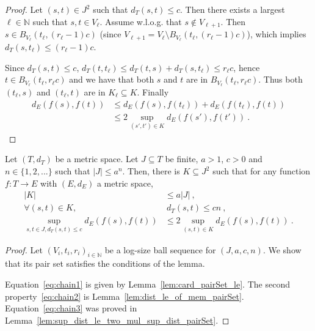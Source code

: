 \begin{proof}
\leanok
Let $(s, t) \in J^2$ such that $d_T(s, t) \le c$.
Then there exists a largest $\ell \in \mathbb{N}$ such that $s, t \in V_\ell$.
Assume w.l.o.g. that $s \notin V_{\ell + 1}$. Then $s \in B_{V_\ell}(t_\ell, (r_\ell-1)c)$ (since $V_{\ell + 1} = V_\ell \setminus B_{V_\ell}(t_\ell, (r_\ell-1)c)$), which implies $d_T(s, t_\ell) \le (r_\ell - 1)c$.

Since $d_T(s, t) \le c$, $d_T(t, t_\ell) \le d_T(t, s) + d_T(s, t_\ell) \le r_\ell c$, hence $t \in B_{V_\ell}(t_\ell, r_\ell c)$ and we have that both $s$ and $t$ are in $B_{V_\ell}(t_\ell, r_\ell c)$.
Thus both $(t_\ell, s)$ and $(t_\ell, t)$ are in $K_\ell \subseteq K$.
Finally
\begin{align*}
  d_E(f(s), f(t))
  &\le d_E(f(s), f(t_\ell)) + d_E(f(t_\ell), f(t))
  \\
  &\le 2\sup_{(s',t') \in K} d_E(f(s'), f(t'))
  \: .
\end{align*}
\end{proof}


\begin{lemma}\label{lem:pair_reduction}
  \mathlibok
Let $(T,d_T)$ be a metric space.
Let $J \subseteq T$ be finite, $a > 1$, $c>0$ and $n \in \{1, 2, ...\}$ such that $|J| \le a^n$.
Then, there is $K \subseteq J^2$ such that for any function $f : T \to E$ with $(E,d_E)$ a metric space,
\begin{align}
  |K|
  & \le a |J|
  \:, \label{eq:chain1} \\
  \forall (s,t) \in K,
  &\:  d_T(s,t) \le c n
  \:, \label{eq:chain2} \\
  \sup_{s,t\in J, d_T(s,t) \le c} d_E(f(s), f(t))
  & \le 2 \sup_{(s,t) \in K} d_E(f(s), f(t))
  \: . \label{eq:chain3}
\end{align}
\end{lemma}

\begin{proof}\leanok
Let $(V_i, t_i, r_i)_{i \in \mathbb{N}}$ be a log-size ball sequence for $(J, a, c, n)$. We show that its pair set satisfies the conditions of the lemma.

Equation~\eqref{eq:chain1} is given by Lemma~\ref{lem:card_pairSet_le}.
The second property~\eqref{eq:chain2} is Lemma~\ref{lem:dist_le_of_mem_pairSet}.
Equation~\eqref{eq:chain3} was proved in Lemma~\ref{lem:sup_dist_le_two_mul_sup_dist_pairSet}.
\end{proof}





